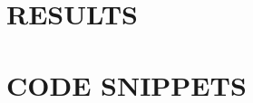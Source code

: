 \documentclass[Dual]{iitddiss}
\begin{document}
\chapter{RESULTS}
\label{chap:results}


\pagebreak


\appendix

\chapter{CODE SNIPPETS}
\label{chap:appendix}

\pagebreak


\label{chap:references}

\pagebreak


\listofpapers

\end{document}
